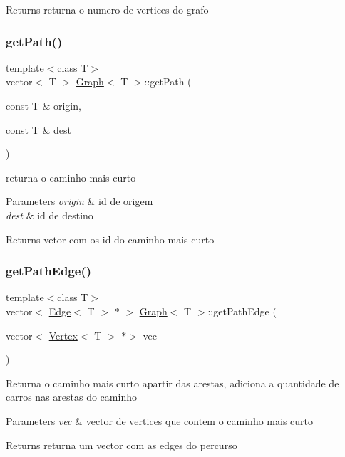 \begin{DoxyReturn}{Returns}
returna o numero de vertices do grafo 
\end{DoxyReturn}
\mbox{\label{class_graph_ab4054ca572c10669dd3e05d6d41c116c}} 
\subsubsection{\texorpdfstring{get\+Path()}{getPath()}}
{\footnotesize\ttfamily template$<$class T$>$ \\
vector$<$ T $>$ \mbox{\hyperlink{class_graph}{Graph}}$<$ T $>$\+::get\+Path (\begin{DoxyParamCaption}\item[{const T \&}]{origin,  }\item[{const T \&}]{dest }\end{DoxyParamCaption})}

returna o caminho mais curto 
\begin{DoxyParams}{Parameters}
{\em origin} & id de origem \\
\hline
{\em dest} & id de destino \\
\hline
\end{DoxyParams}
\begin{DoxyReturn}{Returns}
vetor com os id do caminho mais curto 
\end{DoxyReturn}
\mbox{\label{class_graph_a2cd549a2180e69d5a040eea5e5fcdb96}} 
\subsubsection{\texorpdfstring{get\+Path\+Edge()}{getPathEdge()}}
{\footnotesize\ttfamily template$<$class T$>$ \\
vector$<$ \mbox{\hyperlink{class_edge}{Edge}}$<$ T $>$ $\ast$ $>$ \mbox{\hyperlink{class_graph}{Graph}}$<$ T $>$\+::get\+Path\+Edge (\begin{DoxyParamCaption}\item[{vector$<$ \mbox{\hyperlink{class_vertex}{Vertex}}$<$ T $>$ $\ast$$>$}]{vec }\end{DoxyParamCaption})}

Returna o caminho mais curto apartir das arestas, adiciona a quantidade de carros nas arestas do caminho 
\begin{DoxyParams}{Parameters}
{\em vec} & vector de vertices que contem o caminho mais curto \\
\hline
\end{DoxyParams}
\begin{DoxyReturn}{Returns}
returna um vector com as edges do percurso 
\end{DoxyReturn}
\mbox{\label{class_graph_ab65d16c4aed67dbdfffd62737203b541}} 
